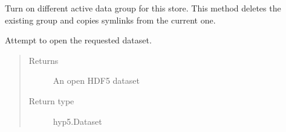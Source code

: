 \documentclass[letterpaper,10pt,english]{sphinxmanual}
\begin{document}
\begin{fulllineitems}
\begin{fulllineitems}
\end{fulllineitems}


\begin{fulllineitems}
\label{\detokenize{xanespy:xanespy.txmstore.TXMStore.energies}}
\end{fulllineitems}


\begin{fulllineitems}
\label{\detokenize{xanespy:xanespy.txmstore.TXMStore.filenames}}
\end{fulllineitems}


\begin{fulllineitems}
\label{\detokenize{xanespy:xanespy.txmstore.TXMStore.fit_parameters}}
\end{fulllineitems}


\begin{fulllineitems}
\label{\detokenize{xanespy:xanespy.txmstore.TXMStore.fork_data_group}}
Turn on different active data group for this store. This method
deletes the existing group and copies symlinks from the
current one.

\end{fulllineitems}


\begin{fulllineitems}
\label{\detokenize{xanespy:xanespy.txmstore.TXMStore.get_dataset}}
Attempt to open the requested dataset.
\begin{quote}\begin{description}
\item[{Returns}] \leavevmode
{} \textendash{} An open HDF5 dataset

\item[{Return type}] \leavevmode
hyp5.Dataset


\end{description}
\end{quote}
\end{fulllineitems}
\end{fulllineitems}
\end{document}
